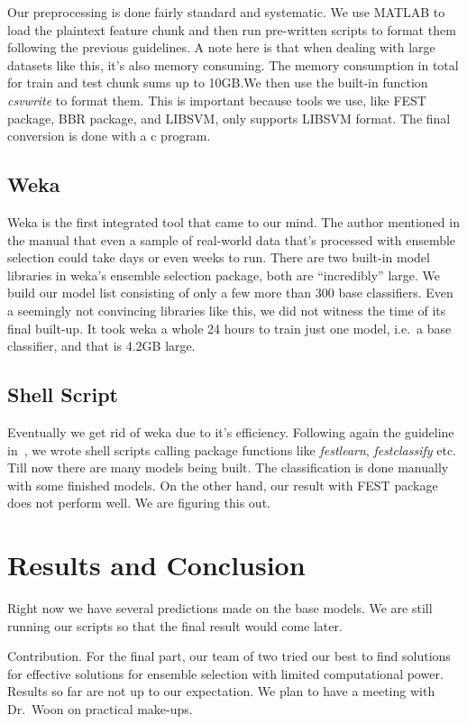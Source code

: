 \documentclass[journal]{IEEEtran}
\begin{document}
Our preprocessing is done fairly standard and systematic. We use
MATLAB to load the plaintext feature chunk and then run pre-written
scripts to format them following the previous guidelines. A note here
is that when dealing with large datasets like this, it's also memory
consuming. The memory consumption in total for train and test chunk
sums up to 10GB.\@ We then use the built-in function \emph{csvwrite}
to format them. This is important because tools we use, like FEST
package, BBR package, and LIBSVM, only supports LIBSVM format. The
final conversion is done with a c program.
\subsection{Weka}
\label{sec:weka}

Weka is the first integrated tool that came to our mind. The author
mentioned in the manual that even a sample of real-world data that's
processed with ensemble selection could take days or even weeks to
run. There are two built-in model libraries in weka's ensemble
selection package, both are ``incredibly'' large. We build our model
list consisting of only a few more than 300 base classifiers. Even a
seemingly not convincing libraries like this, we did not witness the
time of its final built-up. It took weka a whole 24 hours to train
just one model, i.e.\ a base classifier, and that is 4.2GB large.
\subsection{Shell Script}
\label{sec:shell-script}
Eventually we get rid of weka due to it's efficiency. Following again
the guideline in~\cite{Ref:WinningtheKDDCupIBMResearch}, we wrote
shell scripts calling package functions like \emph{festlearn},
\emph{festclassify} etc. Till now there are many models being
built. The classification is done manually with some finished
models. On the other hand, our result with FEST package does not
perform well. We are figuring this out.










\section{Results and Conclusion}
\label{sec:result-conclusion}
Right now we have several predictions made on the base models. We are
still running our scripts so that the final result would come later.
\par
Contribution. For the final part, our team of two tried our best to
find solutions for effective solutions for ensemble selection with
limited computational power. Results so far are not up to our
expectation. We plan to have a meeting with Dr.\ Woon on practical
make-ups. 
\end{document}
